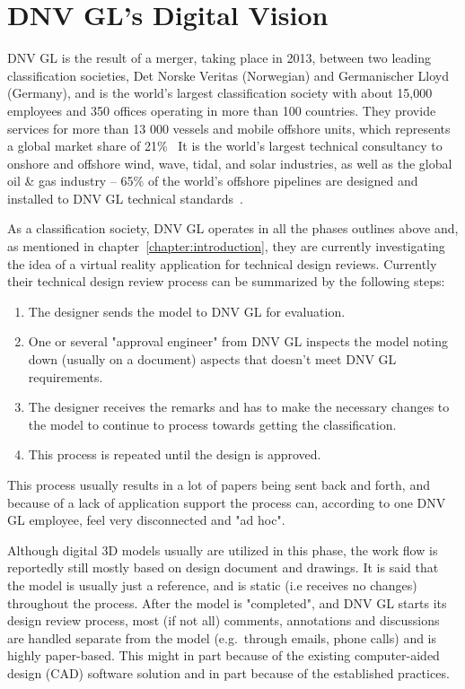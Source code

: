 \section{DNV GL's Digital Vision}
DNV GL is the result of a merger, taking place in 2013, between two leading classification societies, Det Norske Veritas (Norwegian) and Germanischer Lloyd (Germany),
and is the world's largest classification society with about 15,000 employees and 350 offices operating in more than 100 countries. 
They provide services for more than 13 000 vessels and mobile offshore units, which represents a global market share of 21\%~\citep{TO:DNVGL}
It is the world's largest technical consultancy to onshore and offshore wind, wave, tidal, and solar industries, as well as the global oil \& gas industry 
-- 65\% of the world’s offshore pipelines are designed and installed to DNV GL technical standards~\citep{MTN:DNVGL}. 

As a classification society, DNV GL operates in all the phases outlines above and, as mentioned in chapter~\vref{chapter:introduction}, they are 
currently investigating the idea of a virtual reality application for technical design reviews. 
Currently their technical design review process can be summarized by the following steps: 

\begin{enumerate}
	\item The designer sends the model to DNV GL for evaluation.
	\item One or several "approval engineer" from DNV GL inspects the model noting down (usually on a document) aspects that doesn't meet DNV GL requirements.
	\item The designer receives the remarks and has to make the necessary changes to the model to continue to process towards getting the classification.
	\item This process is repeated until the design is approved.
\end{enumerate}

This process usually results in a lot of papers being sent back and forth, and because of a lack of application support the process can, according to one DNV GL employee,
feel very disconnected and "ad hoc". 

Although digital 3D models usually are utilized in this phase, the work flow is reportedly still mostly based on design document and drawings.  
It is said that the model is usually just a reference, and is static (i.e receives no changes) throughout the process. After the model is "completed", and DNV GL starts
its design review process, most (if not all) comments, annotations and discussions are handled separate from the model (e.g.~through emails, phone calls)
and is highly paper-based. This might in part because of the existing computer-aided design (CAD) software solution and in part because of the established practices.

